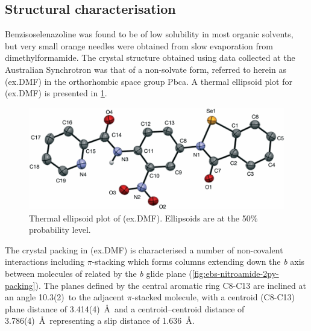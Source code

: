 \begin{refsection}
\subsection{Structural characterisation}
Benzisoselenazoline  was found to be of low solubility in most organic solvents, but very small orange needles were obtained from slow evaporation from dimethylformamide.
The crystal structure obtained using data collected at the Australian Synchrotron was that of a non-solvate form, referred to herein as (ex.DMF) in the orthorhombic space group Pbca.
A thermal ellipsoid plot for (ex.DMF) is presented in \cref{fig:ebs-nitroamide-2py-dmf-xtal}.

\begin{figure}
    \centering
    \includegraphics[width=0.8\linewidth]{Figures/ebs-nitroamide-2py-dmf-xtal.pdf}
    \caption[Thermal ellipsoid plot of (ex.DMF).]{Thermal ellipsoid plot of (ex.DMF). Ellipsoids are at the 50\% probability level.}
    \label{fig:ebs-nitroamide-2py-dmf-xtal}
\end{figure}

The crystal packing in (ex.DMF) is characterised a number of non-covalent interactions including $\pi$-stacking which forms columns extending down the \emph{b} axis between molecules of  related by the \emph{b} glide plane (\cref{fig:ebs-nitroamide-2py-packing}).
The planes defined by the central aromatic ring C8-C13 are inclined at an angle 10.3(2)\degree~to the adjacent $\pi$-stacked molecule, with a centroid (C8-C13) plane distance of 3.414(4)~\AA~and a centroid–centroid distance of 3.786(4)~\AA~representing a slip distance of 1.636~\AA.


\end{refsection}
